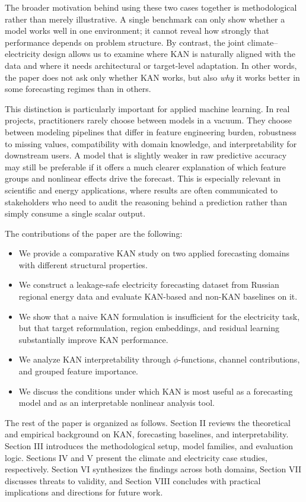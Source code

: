 \documentclass[10pt,conference,onecolumn]{IEEEtran}
\begin{document}
The broader motivation behind using these two cases together is methodological rather than merely illustrative. A single benchmark can only show whether a model works well in one environment; it cannot reveal how strongly that performance depends on problem structure. By contrast, the joint climate--electricity design allows us to examine where KAN is naturally aligned with the data and where it needs architectural or target-level adaptation. In other words, the paper does not ask only whether KAN works, but also \emph{why} it works better in some forecasting regimes than in others.

This distinction is particularly important for applied machine learning. In real projects, practitioners rarely choose between models in a vacuum. They choose between modeling pipelines that differ in feature engineering burden, robustness to missing values, compatibility with domain knowledge, and interpretability for downstream users. A model that is slightly weaker in raw predictive accuracy may still be preferable if it offers a much clearer explanation of which feature groups and nonlinear effects drive the forecast. This is especially relevant in scientific and energy applications, where results are often communicated to stakeholders who need to audit the reasoning behind a prediction rather than simply consume a single scalar output.

The contributions of the paper are the following:
\begin{itemize}
    \item We provide a comparative KAN study on two applied forecasting domains with different structural properties.
    \item We construct a leakage-safe electricity forecasting dataset from Russian regional energy data and evaluate KAN-based and non-KAN baselines on it.
    \item We show that a naive KAN formulation is insufficient for the electricity task, but that target reformulation, region embeddings, and residual learning substantially improve KAN performance.
    \item We analyze KAN interpretability through $\phi$-functions, channel contributions, and grouped feature importance.
    \item We discuss the conditions under which KAN is most useful as a forecasting model and as an interpretable nonlinear analysis tool.
\end{itemize}

The rest of the paper is organized as follows. Section II reviews the theoretical and empirical background on KAN, forecasting baselines, and interpretability. Section III introduces the methodological setup, model families, and evaluation logic. Sections IV and V present the climate and electricity case studies, respectively. Section VI synthesizes the findings across both domains, Section VII discusses threats to validity, and Section VIII concludes with practical implications and directions for future work.
\end{document}
